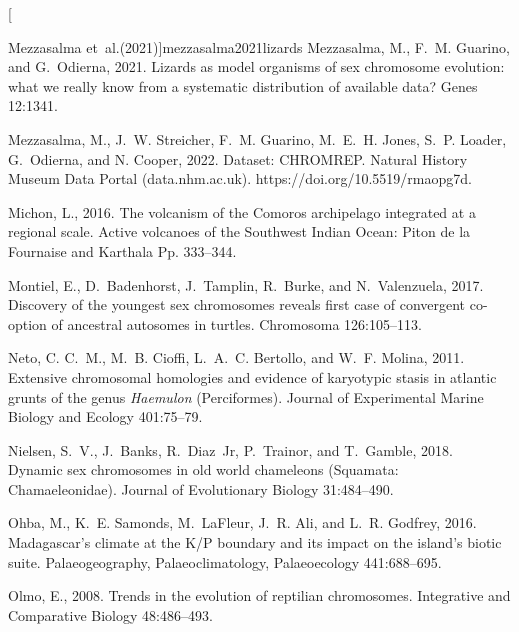 \documentclass[a4paper, 12pt]{article}
\begin{document}
\begin{thebibliography}{73}
\bibitem[{Mezzasalma et~al.(2021)]{mezzasalma2021lizards}
Mezzasalma, M., F.~M. Guarino, and G.~Odierna, 2021.
\newblock Lizards as model organisms of sex chromosome evolution: what we
  really know from a systematic distribution of available data?
\newblock Genes 12:1341.

Mezzasalma, M., J.~W. Streicher, F.~M. Guarino, M.~E.~H. Jones, S.~P. Loader, G.~Odierna, and N. Cooper, 2022.
\newblock Dataset: CHROMREP. Natural History Museum Data Portal (data.nhm.ac.uk). https://doi.org/10.5519/rmaopg7d.

Michon, L., 2016.
\newblock The volcanism of the {C}omoros archipelago integrated at a regional
  scale.
\newblock Active volcanoes of the Southwest Indian Ocean: Piton de la Fournaise
  and Karthala Pp. 333--344.

Montiel, E., D.~Badenhorst, J.~Tamplin, R.~Burke, and N.~Valenzuela, 2017.
\newblock Discovery of the youngest sex chromosomes reveals first case of
  convergent co-option of ancestral autosomes in turtles.
\newblock Chromosoma 126:105--113.

Neto, C. C.~M., M.~B. Cioffi, L.~A.~C. Bertollo, and W.~F. Molina, 2011.
\newblock Extensive chromosomal homologies and evidence of karyotypic stasis in
  atlantic grunts of the genus \textit{Haemulon} ({P}erciformes).
\newblock Journal of Experimental Marine Biology and Ecology 401:75--79.

Nielsen, S.~V., J.~Banks, R.~Diaz~Jr, P.~Trainor, and T.~Gamble, 2018.
\newblock Dynamic sex chromosomes in old world chameleons ({S}quamata:
  {C}hamaeleonidae).
\newblock Journal of Evolutionary Biology 31:484--490.

Ohba, M., K.~E. Samonds, M.~LaFleur, J.~R. Ali, and L.~R. Godfrey, 2016.
\newblock Madagascar's climate at the {K}/{P} boundary and its impact on the
  island's biotic suite.
\newblock Palaeogeography, Palaeoclimatology, Palaeoecology 441:688--695.

Olmo, E., 2008.
\newblock Trends in the evolution of reptilian chromosomes.
\newblock Integrative and Comparative Biology 48:486--493.

}
\end{thebibliography}
\end{document}
